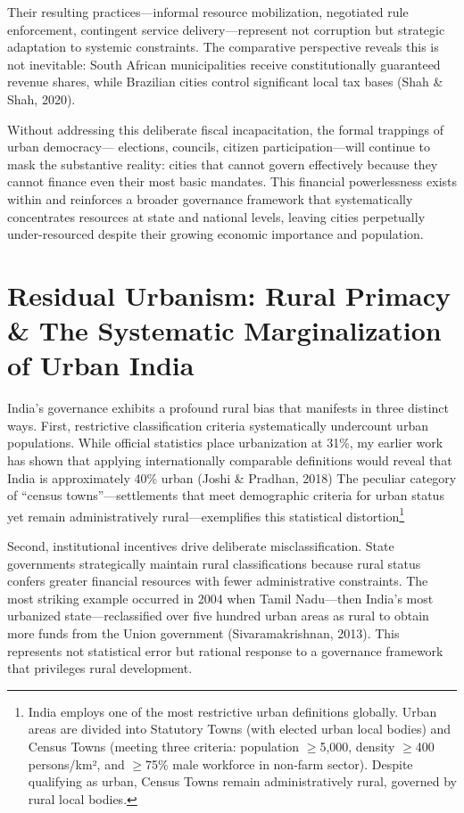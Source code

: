 Their resulting practices—informal resource mobilization, negotiated rule enforcement, contingent service delivery—represent not corruption but strategic adaptation to systemic constraints. The comparative perspective reveals this is not inevitable: South African municipalities receive constitutionally guaranteed revenue shares, while Brazilian cities control significant local tax bases (Shah \& Shah, 2020).

Without addressing this deliberate fiscal incapacitation, the formal trappings of urban democracy— elections, councils, citizen participation—will continue to mask the substantive reality: cities that cannot govern effectively because they cannot finance even their most basic mandates. This financial powerlessness exists within and reinforces a broader governance framework that systematically concentrates resources at state and national levels, leaving cities perpetually under-resourced despite their growing economic importance and population.

\section{Residual Urbanism: Rural Primacy \& The Systematic Marginalization of Urban India}

India's governance exhibits a profound rural bias that manifests in three distinct ways. First, restrictive classification criteria systematically undercount urban populations. While official statistics place urbanization at 31\%, my earlier work has shown that applying internationally comparable definitions would reveal that India is approximately 40\% urban (Joshi \& Pradhan, 2018) The peculiar category of ``census towns''—settlements that meet demographic criteria for urban status yet remain administratively rural—exemplifies this statistical distortion\footnote{India employs one of the most restrictive urban definitions globally. Urban areas are divided into Statutory Towns (with elected urban local bodies) and Census Towns (meeting three criteria: population $\geq$5,000, density $\geq$400 persons/km², and $\geq$75\% male workforce in non-farm sector). Despite qualifying as urban, Census Towns remain administratively rural, governed by rural local bodies.}

Second, institutional incentives drive deliberate misclassification. State governments strategically maintain rural classifications because rural status confers greater financial resources with fewer administrative constraints. The most striking example occurred in 2004 when Tamil Nadu—then India's most urbanized state—reclassified over five hundred urban areas as rural to obtain more funds from the Union government (Sivaramakrishnan, 2013). This represents not statistical error but rational response to a governance framework that privileges rural development.

